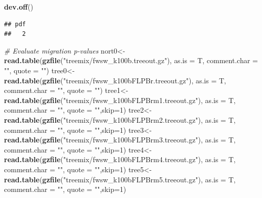 \documentclass[]{article}
\newenvironment{Shaded}{\begin{snugshade}}{\end{snugshade}}
\newcommand{\KeywordTok}[1]{\textcolor[rgb]{0.13,0.29,0.53}{\textbf{#1}}}
\newcommand{\DataTypeTok}[1]{\textcolor[rgb]{0.13,0.29,0.53}{#1}}
\newcommand{\DecValTok}[1]{\textcolor[rgb]{0.00,0.00,0.81}{#1}}
\newcommand{\StringTok}[1]{\textcolor[rgb]{0.31,0.60,0.02}{#1}}
\newcommand{\CommentTok}[1]{\textcolor[rgb]{0.56,0.35,0.01}{\textit{#1}}}
\newcommand{\NormalTok}[1]{#1}
\begin{document}
\begin{Shaded}
\begin{Highlighting}[]
\KeywordTok{dev.off}\NormalTok{()}
\end{Highlighting}
\end{Shaded}

\begin{verbatim}
## pdf 
##   2
\end{verbatim}

\begin{Shaded}
\begin{Highlighting}[]
\CommentTok{# Evaluate migration p-values}
\NormalTok{nort0<-}\KeywordTok{read.table}\NormalTok{(}\KeywordTok{gzfile}\NormalTok{(}\StringTok{"treemix/fwsw_k100b.treeout.gz"}\NormalTok{), }\DataTypeTok{as.is  =}\NormalTok{ T, }\DataTypeTok{comment.char =} \StringTok{""}\NormalTok{, }\DataTypeTok{quote =} \StringTok{""}\NormalTok{)}
\NormalTok{tree0<-}\KeywordTok{read.table}\NormalTok{(}\KeywordTok{gzfile}\NormalTok{(}\StringTok{"treemix/fwsw_k100bFLPBr.treeout.gz"}\NormalTok{), }\DataTypeTok{as.is  =}\NormalTok{ T, }\DataTypeTok{comment.char =} \StringTok{""}\NormalTok{, }\DataTypeTok{quote =} \StringTok{""}\NormalTok{)}
\NormalTok{tree1<-}\KeywordTok{read.table}\NormalTok{(}\KeywordTok{gzfile}\NormalTok{(}\StringTok{"treemix/fwsw_k100bFLPBrm1.treeout.gz"}\NormalTok{), }\DataTypeTok{as.is  =}\NormalTok{ T, }\DataTypeTok{comment.char =} \StringTok{""}\NormalTok{, }\DataTypeTok{quote =} \StringTok{""}\NormalTok{,}\DataTypeTok{skip=}\DecValTok{1}\NormalTok{)}
\NormalTok{tree2<-}\KeywordTok{read.table}\NormalTok{(}\KeywordTok{gzfile}\NormalTok{(}\StringTok{"treemix/fwsw_k100bFLPBrm2.treeout.gz"}\NormalTok{), }\DataTypeTok{as.is  =}\NormalTok{ T, }\DataTypeTok{comment.char =} \StringTok{""}\NormalTok{, }\DataTypeTok{quote =} \StringTok{""}\NormalTok{,}\DataTypeTok{skip=}\DecValTok{1}\NormalTok{)}
\NormalTok{tree3<-}\KeywordTok{read.table}\NormalTok{(}\KeywordTok{gzfile}\NormalTok{(}\StringTok{"treemix/fwsw_k100bFLPBrm3.treeout.gz"}\NormalTok{), }\DataTypeTok{as.is  =}\NormalTok{ T, }\DataTypeTok{comment.char =} \StringTok{""}\NormalTok{, }\DataTypeTok{quote =} \StringTok{""}\NormalTok{,}\DataTypeTok{skip=}\DecValTok{1}\NormalTok{)}
\NormalTok{tree4<-}\KeywordTok{read.table}\NormalTok{(}\KeywordTok{gzfile}\NormalTok{(}\StringTok{"treemix/fwsw_k100bFLPBrm4.treeout.gz"}\NormalTok{), }\DataTypeTok{as.is  =}\NormalTok{ T, }\DataTypeTok{comment.char =} \StringTok{""}\NormalTok{, }\DataTypeTok{quote =} \StringTok{""}\NormalTok{,}\DataTypeTok{skip=}\DecValTok{1}\NormalTok{)}
\NormalTok{tree5<-}\KeywordTok{read.table}\NormalTok{(}\KeywordTok{gzfile}\NormalTok{(}\StringTok{"treemix/fwsw_k100bFLPBrm5.treeout.gz"}\NormalTok{), }\DataTypeTok{as.is  =}\NormalTok{ T, }\DataTypeTok{comment.char =} \StringTok{""}\NormalTok{, }\DataTypeTok{quote =} \StringTok{""}\NormalTok{,}\DataTypeTok{skip=}\DecValTok{1}\NormalTok{)}
\end{Highlighting}
\end{Shaded}
\end{document}
